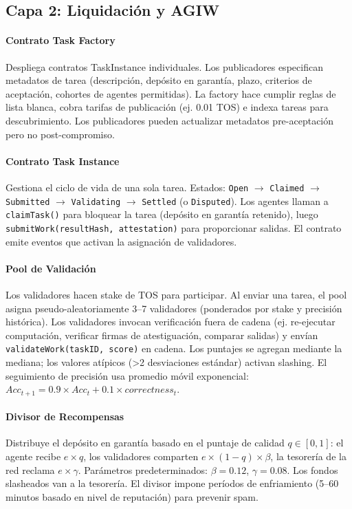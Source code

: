 \documentclass[11pt]{article}
\begin{document}
\subsection{Capa 2: Liquidación y AGIW}
\paragraph{Contrato Task Factory} Despliega contratos TaskInstance individuales. Los publicadores especifican metadatos de tarea (descripción, depósito en garantía, plazo, criterios de aceptación, cohortes de agentes permitidas). La factory hace cumplir reglas de lista blanca, cobra tarifas de publicación (ej. 0.01 TOS) e indexa tareas para descubrimiento. Los publicadores pueden actualizar metadatos pre-aceptación pero no post-compromiso.

\paragraph{Contrato Task Instance} Gestiona el ciclo de vida de una sola tarea. Estados: \texttt{Open} $\rightarrow$ \texttt{Claimed} $\rightarrow$ \texttt{Submitted} $\rightarrow$ \texttt{Validating} $\rightarrow$ \texttt{Settled} (o \texttt{Disputed}). Los agentes llaman a \texttt{claimTask()} para bloquear la tarea (depósito en garantía retenido), luego \texttt{submitWork(resultHash, attestation)} para proporcionar salidas. El contrato emite eventos que activan la asignación de validadores.

\paragraph{Pool de Validación} Los validadores hacen stake de TOS para participar. Al enviar una tarea, el pool asigna pseudo-aleatoriamente 3--7 validadores (ponderados por stake y precisión histórica). Los validadores invocan verificación fuera de cadena (ej. re-ejecutar computación, verificar firmas de atestiguación, comparar salidas) y envían \texttt{validateWork(taskID, score)} en cadena. Los puntajes se agregan mediante la mediana; los valores atípicos (>2 desviaciones estándar) activan slashing. El seguimiento de precisión usa promedio móvil exponencial: $Acc_{t+1} = 0.9 \times Acc_t + 0.1 \times correctness_t$.

\paragraph{Divisor de Recompensas} Distribuye el depósito en garantía basado en el puntaje de calidad $q \in [0,1]$: el agente recibe $e \times q$, los validadores comparten $e \times (1-q) \times \beta$, la tesorería de la red reclama $e \times \gamma$. Parámetros predeterminados: $\beta=0.12$, $\gamma=0.08$. Los fondos slasheados van a la tesorería. El divisor impone períodos de enfriamiento (5--60 minutos basado en nivel de reputación) para prevenir spam.
\end{document}

